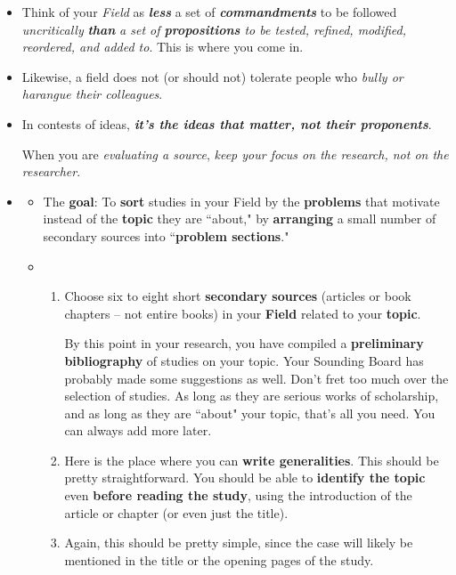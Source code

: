 \documentclass[11pt]{article}
\begin{document}
\begin{itemize}
\item Think of your \emph{Field} as \emph{\textbf{less}} a set of \emph{\textbf{commandments}} to be followed \emph{uncritically} \emph{\textbf{than}} \emph{a set of \textbf{propositions} to be tested, refined, modified, reordered, and added to}. This is where you come in.

\item Likewise, a field does not (or should not) tolerate people who \emph{bully or harangue their colleagues}.

\item In contests of ideas, \emph{\textbf{it’s the ideas that matter, not their proponents}}.

When you are \emph{evaluating a source}, \emph{keep your focus on the research, not on the researcher}.

\item \begin{exercise}
\begin{itemize}
\item The \textbf{goal}: To \textbf{sort} studies in your Field by the \textbf{problems} that motivate instead of the \textbf{topic} they are ``about," by \textbf{arranging} a small number of secondary sources into ``\textbf{problem sections}."

\item \begin{enumerate}
\item Choose six to eight short \textbf{secondary sources} (articles or book chapters -- not entire books) in your \textbf{Field} related to your \textbf{topic}. 

By this point in your research, you have compiled a \textbf{preliminary bibliography} of studies on your topic. Your Sounding Board has probably made some suggestions as well. Don’t fret too much over the selection of studies. As long as they are serious works of scholarship, and as long as they are ``about" your topic, that’s all you need. You can always add more later.

\item  Here is the place where you can \textbf{write generalities}. This should be pretty straightforward. You should be able to \textbf{identify the topic} even \textbf{before reading the study}, using the introduction of the article or chapter (or even just the title).

\item  Again, this should be pretty simple, since the case will likely be mentioned in the title or the opening pages of the study.


\end{enumerate}
\end{itemize}
\end{exercise}
\end{itemize}
\end{document}
